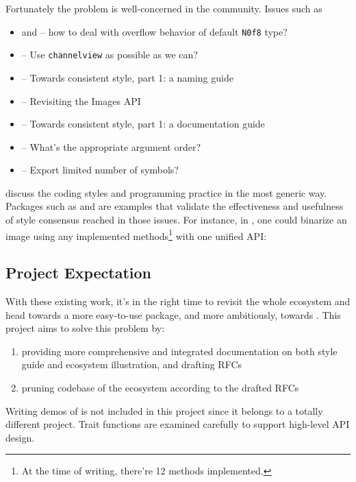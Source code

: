 Fortunately the problem is well-concerned in the community. Issues such as
\begin{itemize}
    \item {} and  -- how to deal with overflow behavior of default \texttt{N0f8} type?
    \item {} -- Use \texttt{channelview} as possible as we can?
    \item {} -- Towards consistent style, part 1: a naming guide
    \item {} -- Revisiting the Images API
    \item {} -- Towards consistent style, part 1: a documentation guide
    \item {} -- What's the appropriate argument order?
    \item {} -- Export limited number of symbols?
\end{itemize}
discuss the coding styles and programming practice in the most generic way. Packages such as \repohistogramthresholding and \repoimagebinarization are examples that validate the effectiveness and usefulness of style consensus reached in those issues. For instance, in \imagebinarization, one could binarize an image using any implemented methods\footnote{At the time of writing, there're 12 methods implemented.} with one unified API:

\subsection*{Project Expectation}
With these existing work, it's in the right time to revisit the whole \images{} ecosystem and head towards a more easy-to-use \images{} package, and more ambitiously, towards \images{} . This project aims to solve this problem by:
\begin{enumerate}
    \item providing more comprehensive and integrated documentation on both style guide and ecosystem illustration, and drafting RFCs
    \item pruning codebase of the ecosystem according to the drafted RFCs
\end{enumerate}
Writing demos of \images{} is not included in this project since it belongs to a totally different project. Trait functions are examined carefully to support high-level API design.

